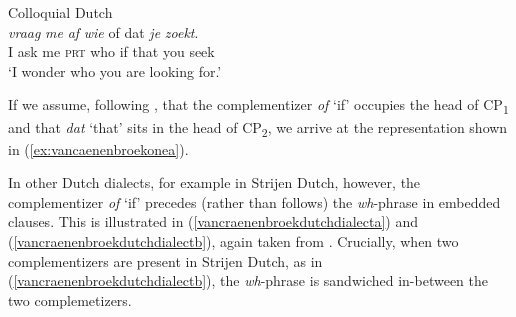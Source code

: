 
\begin{exe}
\ex Colloquial Dutch \citep[45]{van2012you} \\  {\textit{vraag}} {\textit{me}} {\textit{af}} {\textit{wie}} {of} {dat} {\textit{je}} {\textit{zoekt}.}  \\
{I} {ask} {me} {\textsc{prt}} {who} {if} {that} {you} {seek} \\
\trans `I wonder who you are looking for.' \label{colloquialdutchcraenenbroekzweitausenddreizehn}

\end{exe}

\noindent If we assume, following \citet{van2012you}, that the complementizer \textit{of} `if' occupies the head of CP\textsubscript{1} and that \textit{dat} `that' sits in the head of CP\textsubscript{2}, we arrive at the representation shown in (\ref{ex:vancaenenbroekonea}).

\begin{exe}
\ex\label{ex:vancaenenbroekonea} 
\end{exe}

\noindent In other Dutch dialects, for example in Strijen Dutch, however, the complementizer \textit{of} `if' precedes (rather than follows) the \textit{wh}-phrase in embedded clauses. This is illustrated in (\ref{vancraenenbroekdutchdialecta}) and (\ref{vancraenenbroekdutchdialectb}), again taken from \citet[45--46]{van2012you}. Crucially, when two complementizers are present in Strijen Dutch, as in (\ref{vancraenenbroekdutchdialectb}), the \textit{wh}-phrase is sandwiched in-between the two complemetizers.

